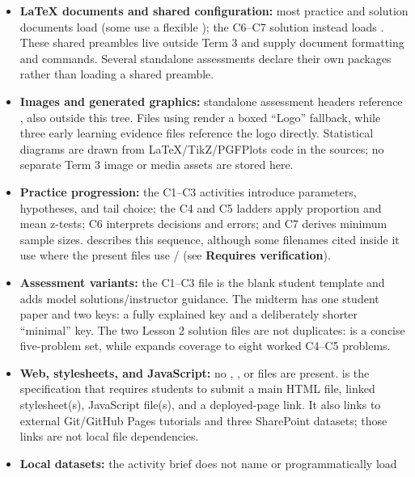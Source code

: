 \begin{itemize}
\item \textbf{LaTeX documents and shared configuration:} most practice and solution
  documents load  (some use a flexible
  ); the C6–C7 solution instead loads . These shared
  preambles live outside Term 3 and supply document formatting and commands.
  Several standalone assessments declare their own packages rather than loading
  a shared preamble.
\item \textbf{Images and generated graphics:} standalone assessment headers reference
  , also outside this tree. Files using
   render a boxed “Logo” fallback, while three early learning
  evidence files reference the logo directly. Statistical diagrams are drawn
  from LaTeX/TikZ/PGFPlots code in the sources; no separate Term 3 image or media
  assets are stored here.
\item \textbf{Practice progression:} the C1–C3 activities introduce parameters,
  hypotheses, and tail choice; the C4 and C5 ladders apply proportion and mean
  z-tests; C6 interprets decisions and errors; and C7 derives minimum sample
  sizes.  describes this sequence, although some filenames
  cited inside it use  where the present files use / (see
  \textbf{Requires verification}).
\item \textbf{Assessment variants:} the C1–C3  file is the blank student
  template and  adds model solutions/instructor guidance. The
  midterm has one student paper and two keys: a fully explained key and a
  deliberately shorter “minimal” key. The two Lesson 2 solution files are not
  duplicates:  is a concise
  five-problem set, while  expands coverage to
  eight worked C4–C5 problems.
\item \textbf{Web, stylesheets, and JavaScript:} no , , or  files are
  present.  is the specification that requires
  students to submit a main HTML file, linked stylesheet(s), JavaScript file(s),
  and a deployed-page link. It also links to external Git/GitHub Pages tutorials
  and three SharePoint datasets; those links are not local file dependencies.
\item \textbf{Local datasets:} the activity brief does not name or programmatically load

\end{itemize}
